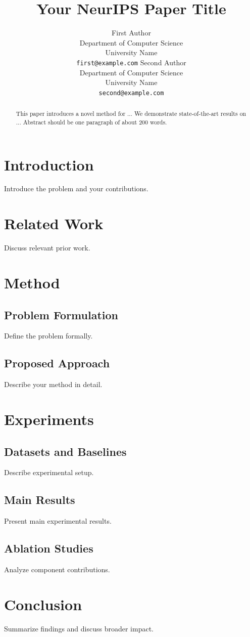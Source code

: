 \documentclass[11pt]{article}
\title{Your NeurIPS Paper Title}
\author{
  First Author \\
  Department of Computer Science \\
  University Name \\
  \texttt{first@example.com}
  \And
  Second Author \\
  Department of Computer Science \\
  University Name \\
  \texttt{second@example.com}
}
\begin{document}
\maketitle

\begin{abstract}
This paper introduces a novel method for ... We demonstrate state-of-the-art results on ... Abstract should be one paragraph of about 200 words.
\end{abstract}

\section{Introduction}
Introduce the problem and your contributions.

\section{Related Work}
Discuss relevant prior work.

\section{Method}
\subsection{Problem Formulation}
Define the problem formally.

\subsection{Proposed Approach}
Describe your method in detail.

\section{Experiments}
\subsection{Datasets and Baselines}
Describe experimental setup.

\subsection{Main Results}
Present main experimental results.

\subsection{Ablation Studies}
Analyze component contributions.

\section{Conclusion}
Summarize findings and discuss broader impact.



\end{document}
